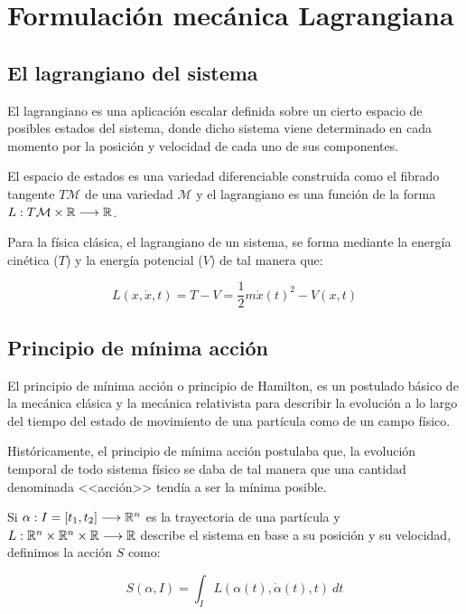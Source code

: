 \chapter{Formulación mecánica Lagrangiana}


\section{El lagrangiano del sistema}

El lagrangiano es una aplicación escalar definida sobre un cierto espacio de posibles estados del sistema, donde dicho sistema viene determinado en cada momento por la posición y velocidad de cada uno de sus componentes.

El espacio de estados es una variedad diferenciable construida como el fibrado tangente $T\mathcal{M}$ de una variedad $\mathcal{M}$ y el lagrangiano es una función de la forma $L:T\mathcal{M}\times\mathbb{R}\longrightarrow \mathbb{R}$.

Para la física clásica, el lagrangiano de un sistema, se forma mediante la energía cinética ($T$) y la energía potencial ($V$) de tal manera que:
\begin{postulate}
    \begin{equation}
        \label{eq:lagrangiano_clasico}
        L(x,\dot{x},t)=T-V=\frac{1}{2}m\dot{x}(t)^2-V(x,t)
    \end{equation}
\end{postulate}


\section{Principio de mínima acción}

El principio de mínima acción o principio de Hamilton, es un postulado básico de la mecánica clásica y la mecánica relativista para describir la evolución a lo largo del tiempo del estado de movimiento de una partícula como de un campo físico.

Históricamente, el principio de mínima acción postulaba que, la evolución temporal de todo sistema físico se daba de tal manera que una cantidad denominada <<acción>> tendía a ser la mínima posible.

Si $\alpha:I=[t_1, t_2]\longrightarrow \mathbb{R}^n$ es la trayectoria de una partícula y $L:\mathbb{R}^n\times\mathbb{R}^n\times\mathbb{R}\longrightarrow \mathbb{R}$ describe el sistema en base a su posición y su velocidad, definimos la acción $S$ como:
\begin{postulate}
    \begin{equation}
        \label{eq:accion}
        S(\alpha,I)=\int_{I}L(\alpha(t), \dot{\alpha}(t), t)\ dt
    \end{equation}
\end{postulate}


